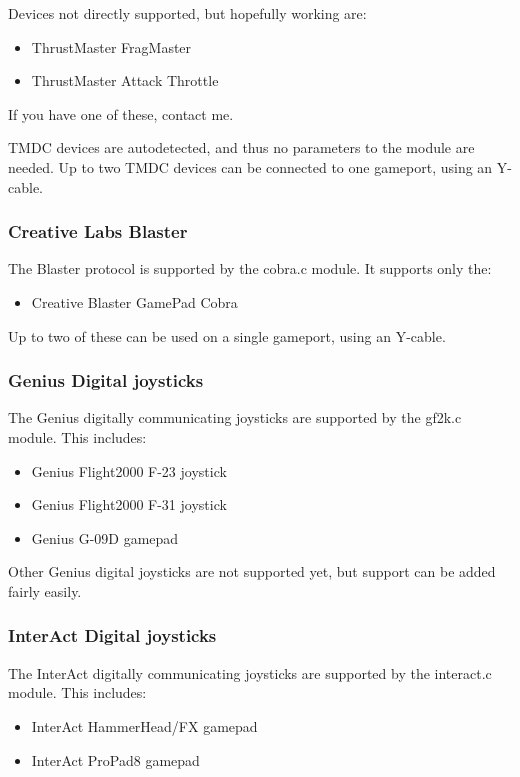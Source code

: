 \documentclass[a4paper,8pt,english]{sphinxmanual}
\begin{document}
Devices not directly supported, but hopefully working are:
\begin{itemize}
\item {} 
ThrustMaster FragMaster

\item {} 
ThrustMaster Attack Throttle

\end{itemize}

If you have one of these, contact me.

TMDC devices are autodetected, and thus no parameters to the module
are needed. Up to two TMDC devices can be connected to one gameport, using
an Y-cable.


\subsubsection{Creative Labs Blaster}
\label{input/joydev/joystick:creative-labs-blaster}
The Blaster protocol is supported by the cobra.c module. It supports only
the:
\begin{itemize}
\item {} 
Creative Blaster GamePad Cobra

\end{itemize}

Up to two of these can be used on a single gameport, using an Y-cable.


\subsubsection{Genius Digital joysticks}
\label{input/joydev/joystick:genius-digital-joysticks}
The Genius digitally communicating joysticks are supported by the gf2k.c
module. This includes:
\begin{itemize}
\item {} 
Genius Flight2000 F-23 joystick

\item {} 
Genius Flight2000 F-31 joystick

\item {} 
Genius G-09D gamepad

\end{itemize}

Other Genius digital joysticks are not supported yet, but support can be
added fairly easily.


\subsubsection{InterAct Digital joysticks}
\label{input/joydev/joystick:interact-digital-joysticks}
The InterAct digitally communicating joysticks are supported by the
interact.c module. This includes:
\begin{itemize}
\item {} 
InterAct HammerHead/FX gamepad

\item {} 
InterAct ProPad8 gamepad

\end{itemize}
\end{document}
